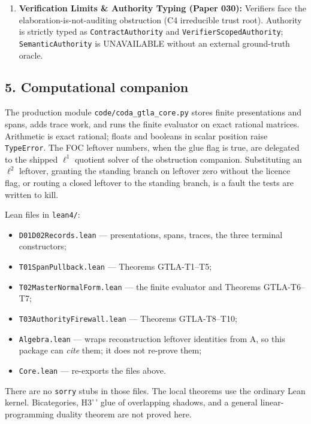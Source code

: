 \documentclass[
  11pt,
]{article}
\providecommand{\tightlist}{%
  \setlength{\itemsep}{0pt}\setlength{\parskip}{0pt}}
\begin{document}
\begin{enumerate}
\item
  \textbf{Verification Limits \& Authority Typing (Paper 030):} Verifiers face the elaboration-is-not-auditing obstruction (C4 irreducible trust root). Authority is strictly typed as \texttt{ContractAuthority} and \nolinkurl{VerifierScopedAuthority}; \texttt{SemanticAuthority} is UNAVAILABLE without an external ground-truth oracle.
\end{enumerate}

\subsection{5. Computational companion}\label{computational-companion}

The production module \nolinkurl{code/coda_gtla_core.py} stores finite presentations and spans, adds trace work, and runs the finite evaluator on exact rational matrices. Arithmetic is exact rational; floats and booleans in scalar position raise \texttt{TypeError}. The FOC leftover numbers, when the glue flag is true, are delegated to the shipped \(\ell^1\) quotient solver of the obstruction companion. Substituting an \(\ell^2\) leftover, granting the standing branch on leftover zero without the licence flag, or routing a closed leftover to the standing branch, is a fault the tests are written to kill.

Lean files in \texttt{lean4/}:

\begin{itemize}
\tightlist
\item
  \nolinkurl{D01D02Records.lean} --- presentations, spans, traces, the three terminal constructors;
\item
  \nolinkurl{T01SpanPullback.lean} --- Theorems GTLA-T1--T5;
\item
  \nolinkurl{T02MasterNormalForm.lean} --- the finite evaluator and Theorems GTLA-T6--T7;
\item
  \nolinkurl{T03AuthorityFirewall.lean} --- Theorems GTLA-T8--T10;
\item
  \nolinkurl{Algebra.lean} --- wraps reconstruction leftover identities from A, so this package can \emph{cite} them; it does not re-prove them;
\item
  \texttt{Core.lean} --- re-exports the files above.
\end{itemize}

There are no \texttt{sorry} stubs in those files. The local theorems use the ordinary Lean kernel. Bicategories, H3'\,' glue of overlapping shadows, and a general linear-programming duality theorem are not proved here.
\end{document}
